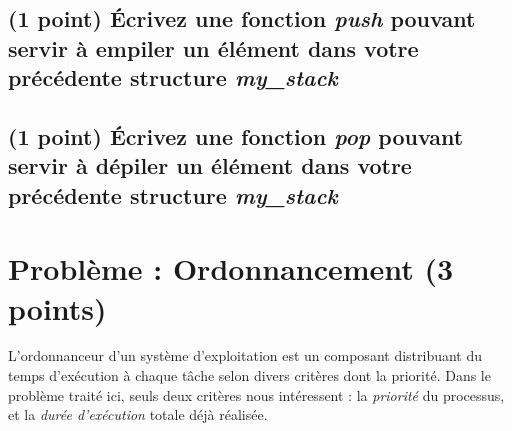 \documentclass[11pt,a4paper]{article}
\begin{document}
\begin{center}
\begin{table}[ht!]
  \begin{minipage}{0.48\textwidth}

\subsection{(1 point) \'Ecrivez une fonction \og \textit{push} \fg{} pouvant servir à empiler un élément dans votre précédente structure \og \textit{my\_stack} \fg{} }

\medskip

\begin{center}
\end{center}

  \end{minipage}
  \hfillx
  \begin{minipage}{0.48\textwidth}

\subsection{(1 point) \'Ecrivez une fonction \og \textit{pop} \fg{} pouvant servir à dépiler un élément dans votre précédente structure \og \textit{my\_stack} \fg{} }

\medskip

\begin{center}
\end{center}

  \end{minipage}
\end{table}
\end{center}


\clearpage


\section{Problème : Ordonnancement (3 points)}

\noindent L'ordonnanceur d'un système d'exploitation est un composant distribuant du temps d'exécution à chaque tâche selon divers critères dont la priorité.
Dans le problème traité ici, seuls deux critères nous intéressent : la \textit{priorité} du processus, et la \textit{durée d'exécution} totale déjà réalisée.

\medskip
\end{document}
